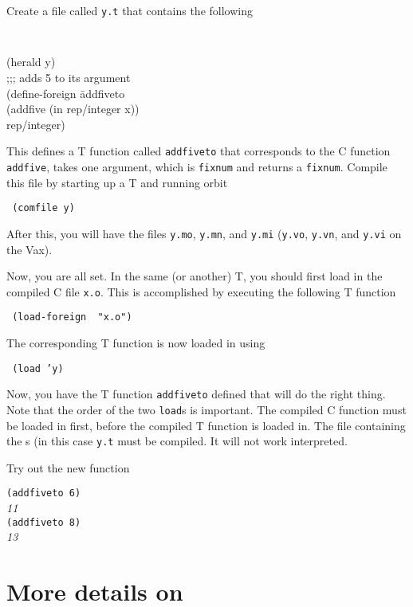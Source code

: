 Create a file called {\tt y.t} that contains the following

\horizline
{\tt
\begin{tabbing}
(herald y)\\[2ex]
;;; adds 5 to its argument\\
(define-foreign \= addfiveto\\
	\> (addfive (in rep/integer x))\\
	\> rep/integer)
\end{tabbing}
}
\horizline

This defines a T function called {\tt addfiveto} that corresponds to
the C function {\tt addfive}, takes one argument, which is
{\tt fixnum} and returns a {\tt fixnum}.
Compile this file by starting up a T and running orbit
\begin{center}
\tt
(comfile y)
\end{center}
After this, you will have the files {\tt y.mo},
{\tt y.mn}, and {\tt y.mi} ({\tt y.vo},
{\tt y.vn}, and {\tt y.vi} on the Vax).

Now, you are all set.
In the same (or another) T, you should first load in the compiled C
file {\tt x.o}.
This is accomplished by executing the following T function
\begin{center}
\tt
(load-foreign~~\verb!"!x.o\verb!"!)
\end{center}
The corresponding T function is now loaded in using
\begin{center}
\tt
(load 'y)
\end{center}
Now, you have the T function {\tt addfiveto} defined that will do the
right thing.
Note that the order of the two {\tt load}s is important.
The compiled C function must be loaded in first, before the compiled T
function is loaded in.
The file containing the \df s (in this case {\tt y.t}
must be compiled.
It will not work interpreted.

Try out the new function

\horizline
\begin{tabbing}
{\tt (addfiveto 6)}\\
{\em 11}\\
{\tt (addfiveto 8)}\\
{\em 13}
\end{tabbing}
\horizline

\section{More details on \lf}
\label{sec-lf-details}

